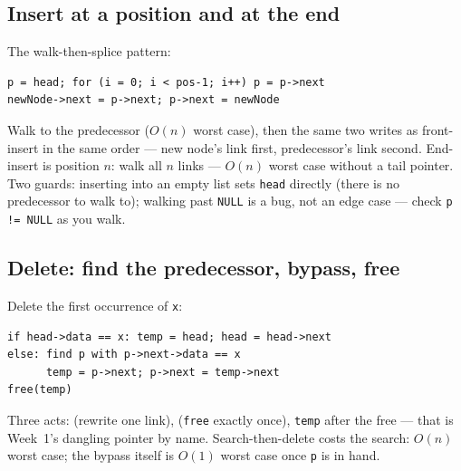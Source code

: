 \documentclass[11pt]{article}
\begin{document}
\subsection{Insert at a position and at the end}

The walk-then-splice pattern:
{\footnotesize
\begin{verbatim}
p = head; for (i = 0; i < pos-1; i++) p = p->next
newNode->next = p->next; p->next = newNode
\end{verbatim}
}
Walk to the predecessor ($O(n)$ worst case), then the same two writes as front-insert in the same order --- new node's link first, predecessor's link second. End-insert is position $n$: walk all $n$ links --- $O(n)$ worst case without a tail pointer. Two guards: inserting into an empty list sets \texttt{head} directly (there is no predecessor to walk to); walking past \texttt{NULL} is a bug, not an edge case --- check \texttt{p != NULL} as you walk.

\subsection{Delete: find the predecessor, bypass, free}

Delete the first occurrence of \texttt{x}:
{\footnotesize
\begin{verbatim}
if head->data == x: temp = head; head = head->next
else: find p with p->next->data == x
      temp = p->next; p->next = temp->next
free(temp)
\end{verbatim}
}
Three acts:  (rewrite one link),  (\texttt{free} exactly once),  \texttt{temp} after the free --- that is Week~1's dangling pointer by name. Search-then-delete costs the search: $O(n)$ worst case; the bypass itself is $O(1)$ worst case once \texttt{p} is in hand.
\end{document}
